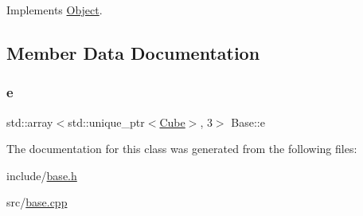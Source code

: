 Implements \hyperlink{classObject_a262654508b0a6a8cd277911161c71024}{Object}.



\subsection{Member Data Documentation}
\mbox{\label{classBase_a1637c5b4562fa8c6eab5563ee089f948}} 
\subsubsection{\texorpdfstring{e}{e}}
{\footnotesize\ttfamily std\+::array$<$std\+::unique\+\_\+ptr$<$\hyperlink{classCube}{Cube}$>$, 3$>$ Base\+::e\hspace{0.3cm}{\ttfamily [private]}}



The documentation for this class was generated from the following files\+:\begin{DoxyCompactItemize}
\item 
include/\hyperlink{base_8h}{base.\+h}\item 
src/\hyperlink{base_8cpp}{base.\+cpp}\end{DoxyCompactItemize}

